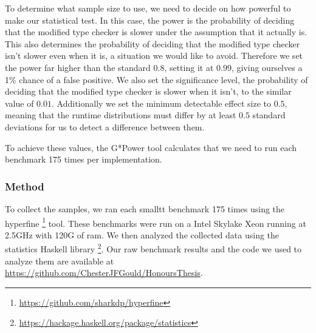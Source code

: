 To determine what sample size to use, we need to decide on how powerful to make our statistical test.
In this case, the power is the probability of deciding that the modified type checker is slower under the assumption that it actually is.
This also determines the probability of deciding that the modified type checker isn't slower even when it is, a situation we would like to avoid.
Therefore we set the power far higher than the standard $0.8$, setting it at $0.99$, giving ourselves a 1\% chance of a false positive.
We also set the significance level, the probability of deciding that the modified type checker is slower when it isn't, to the similar value of $0.01$.
Additionally we set the minimum detectable effect size to $0.5$, meaning that the runtime distributions must differ by at least $0.5$ standard deviations for us to detect a difference between them.

To achieve these values, the G*Power tool \citep{Faul2009} calculates that we need to run each benchmark 175 times per implementation.

\subsubsection{Method}
To collect the samples, we ran each smalltt benchmark 175 times using the hyperfine \footnote{\url{https://github.com/sharkdp/hyperfine}} tool.
These benchmarks were run on a Intel Skylake Xeon running at 2.5GHz with 120G of ram.
We then analyzed the collected data using the statistics Haskell library \footnote{\url{https://hackage.haskell.org/package/statistics}}.
Our raw benchmark results and the code we used to analyze them are available at \url{https://github.com/ChesterJFGould/HonoursThesis}.


